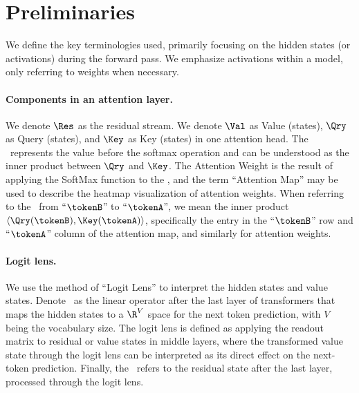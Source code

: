 \section{Preliminaries}
\label{sec:prelim}
\label{sec:term}
We define the key terminologies used, primarily focusing on the hidden states (or activations) during the forward pass. We emphasize activations within a model, only referring to weights when necessary.

\paragraph{Components in an attention layer.} We denote $\Res$ as the residual stream. We denote $\Val$ as Value (states), $\Qry$ as Query (states), and $\Key$ as Key (states) in one attention head. The \attlogit~represents the value before the softmax operation and can be understood as the inner product between  $\Qry$  and  $\Key$. The Attention Weight is the result of applying the SoftMax function to the \attlogit, and the term ``Attention Map'' may be used to describe the heatmap visualization of attention weights. When referring to the \attlogit~from ``$\tokenB$'' to  ``$\tokenA$'', we mean the inner product  $\langle\Qry(\tokenB), \Key(\tokenA)\rangle$, specifically the entry in the ``$\tokenB$'' row and ``$\tokenA$'' column of the attention map, and similarly for attention weights. 

\paragraph{Logit lens.} We use the method of ``Logit Lens'' to interpret the hidden states and value states. Denote \readout~as the linear operator after the last layer of transformers that maps the hidden states to a $\R^V$ space for the next token prediction, with $V$ being the vocabulary size. 
The logit lens is defined as applying the readout matrix to residual or value states in middle layers, where the transformed value state through the logit lens can be interpreted as its direct effect on the next-token prediction. Finally, the \logit~refers to the residual state after the last layer, processed through the logit lens.


